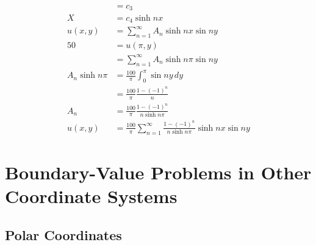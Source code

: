 \documentclass{article}
\begin{document}
\begin{align*}
                    & = c_3                                                                                     \\
  X                 & = c_4 \sinh n x                                                                           \\
  u(x, y)           & = \sum_{n = 1}^\infty A_n \sinh n x \sin n y                                              \\
  50                & = u(\pi, y)                                                                               \\
                    & = \sum_{n = 1}^\infty A_n \sinh n \pi \sin n y                                            \\
  A_n \sinh n \pi   & = \frac{100}{\pi} \int_0^\pi \sin n y \,d y                                               \\
                    & = \frac{100}{\pi} \frac{1 - (-1)^n}{n}                                                    \\
  A_n               & = \frac{100}{\pi} \frac{1 - (-1)^n}{n \sinh n \pi}                                        \\
  u(x, y)           & = \frac{100}{\pi} \sum_{n = 1}^\infty \frac{1 - (-1)^n}{n \sinh n \pi} \sinh n x \sin n y
\end{align*}

\section{Boundary-Value Problems in Other Coordinate Systems}

\subsection{Polar Coordinates}

\subsubsection{}
\end{document}
